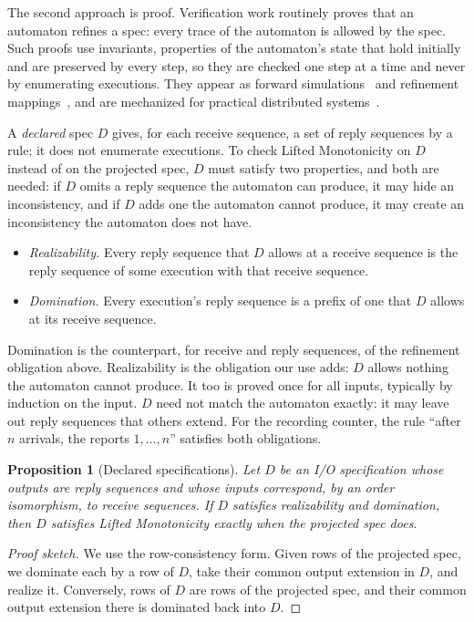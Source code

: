 \documentclass[sigconf]{cidr-2027}
\newtheorem{proposition}{Proposition}
\theoremstyle{remark}
\newcommand{\outnoun}{output extension\xspace}%
\newcommand{\spectype}[1][]{I/O specification#1\xspace}
\begin{document}
The second approach is proof. Verification work routinely proves that an
automaton refines a spec: every trace of the automaton is allowed by the spec. Such proofs use invariants, properties of the automaton's state that hold
initially and are preserved by every step, so they are checked one step at a
time and never by enumerating executions. They appear as forward
simulations~\cite{lynch1995forward} and refinement
mappings~\cite{abadi1991refinement}, and are mechanized for practical
distributed systems~\cite{hawblitzel2015ironfleet}.

A \emph{declared} spec $D$ gives, for each receive sequence, a set of reply
sequences by a rule; it does not enumerate executions. To check Lifted
Monotonicity on $D$ instead of on the projected spec, $D$ must satisfy two
properties, and both are needed: if $D$ omits a reply sequence the automaton
can produce, it may hide an inconsistency, and if $D$ adds one the automaton cannot produce, it may create an inconsistency the automaton does not have.
\begin{itemize}
\item
\emph{Realizability.}  Every reply sequence that $D$ allows at a
        receive sequence is the reply sequence of some execution with that
        receive sequence.
\item
\emph{Domination.}  Every execution's reply sequence is a prefix of
        one that $D$ allows at its receive sequence.
\end{itemize}
Domination is the counterpart, for receive and reply sequences, of the
refinement obligation above. Realizability is the obligation our use adds:
$D$ allows nothing the automaton cannot produce. It too is proved once for all
inputs, typically by induction on the input. $D$ need not match the automaton
exactly: it may leave out reply sequences that others extend. For the
recording counter, the rule ``after $n$ arrivals, the reports $1,\ldots,n$''
satisfies both obligations.

\begin{proposition}[Declared specifications]
\label{prop:declared-specification}
Let $D$ be an \spectype whose outputs are reply sequences and whose inputs
correspond, by an order isomorphism, to receive sequences. If $D$ satisfies
realizability and domination, then $D$ satisfies Lifted Monotonicity exactly
when the projected spec does.
\end{proposition}

\begin{proof}[Proof sketch]
We use the row-consistency form. Given rows of the projected spec, we
dominate each by a row of $D$, take their common \outnoun in $D$, and realize
it. Conversely, rows of $D$ are rows of the projected spec, and their common
\outnoun there is dominated back into $D$.
\end{proof}
\end{document}
